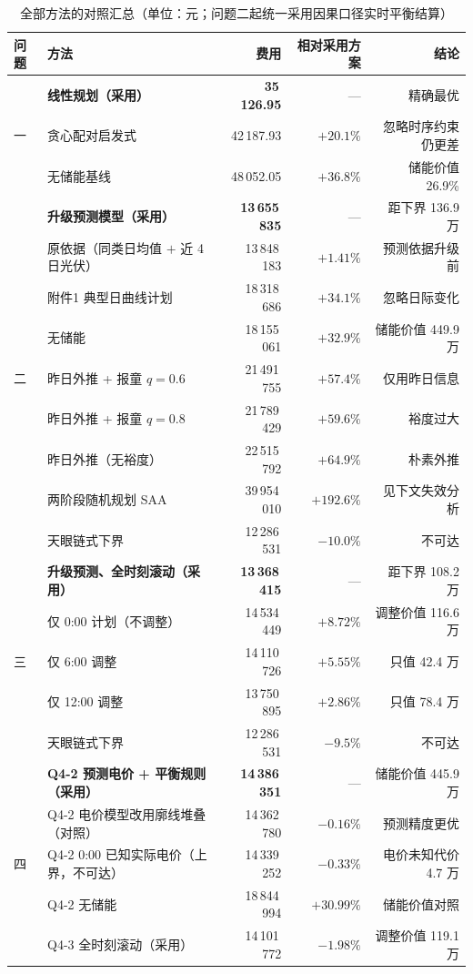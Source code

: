\documentclass[12pt,a4paper,fontset=fandol]{ctexart}
\begin{document}
\begin{table}[htbp]
\centering
\caption{全部方法的对照汇总（单位\nobreak：元\nobreak；问题二起统一采用因果口径实时平衡结算\nobreak）}
\label{tab:allcmp}
\begin{tabularx}{\textwidth}{@{}p{1.5cm}Xrrr@{}}
\toprule
问题 & 方法 & 费用 & 相对采用方案 & 结论 \\
\midrule
\multirow{3}{*}{一}
& \textbf{线性规划（采用\nobreak）} & \textbf{35\,126.95} & --- & 精确最优 \\
& 贪心配对启发式 & 42\,187.93 & $+20.1\text{\%}$ & 忽略时序约束仍更差 \\
& 无储能基线 & 48\,052.05 & $+36.8\text{\%}$ & 储能价值 26.9\% \\
\midrule
\multirow{9}{*}{二}
& \textbf{升级预测模型（采用\nobreak）} & \textbf{13\,655\,835} & --- & 距下界 136.9 万 \\
& 原依据（同类日均值 $+$ 近 4 日光伏\nobreak） & 13\,848\,183 & $+1.41\text{\%}$ & 预测依据升级前 \\
& 附件1 典型日曲线计划 & 18\,318\,686 & $+34.1\text{\%}$ & 忽略日际变化 \\
& 无储能 & 18\,155\,061 & $+32.9\text{\%}$ & 储能价值 449.9 万 \\
& 昨日外推 + 报童 $q=0.6$ & 21\,491\,755 & $+57.4\text{\%}$ & 仅用昨日信息 \\
& 昨日外推 + 报童 $q=0.8$ & 21\,789\,429 & $+59.6\text{\%}$ & 裕度过大 \\
& 昨日外推（无裕度\nobreak） & 22\,515\,792 & $+64.9\text{\%}$ & 朴素外推 \\
& 两阶段随机规划 SAA & 39\,954\,010 & $+192.6\text{\%}$ & 见下文失效分析 \\
& 天眼链式下界 & 12\,286\,531 & $-10.0\text{\%}$ & 不可达 \\
\midrule
\multirow{5}{*}{三}
& \textbf{升级预测\nobreak、全时刻滚动（采用\nobreak）} & \textbf{13\,368\,415} & --- & 距下界 108.2 万 \\
& 仅 0:00 计划（不调整\nobreak） & 14\,534\,449 & $+8.72\text{\%}$ & 调整价值 116.6 万 \\
& 仅 6:00 调整 & 14\,110\,726 & $+5.55\text{\%}$ & 只值 42.4 万 \\
& 仅 12:00 调整 & 13\,750\,895 & $+2.86\text{\%}$ & 只值 78.4 万 \\
& 天眼链式下界 & 12\,286\,531 & $-9.5\text{\%}$ & 不可达 \\
\midrule
\multirow{5}{*}{四}
& \textbf{Q4-2 预测电价 + 平衡规则（采用\nobreak）} & \textbf{14\,386\,351} & --- & 储能价值 445.9 万 \\
& Q4-2 电价模型改用廓线堆叠（对照\nobreak） & 14\,362\,780 & $-0.16\text{\%}$ & 预测精度更优 \\
& Q4-2 0:00 已知实际电价（上界\nobreak，不可达\nobreak） & 14\,339\,252 & $-0.33\text{\%}$ & 电价未知代价 4.7 万 \\
& Q4-2 无储能 & 18\,844\,994 & $+30.99\text{\%}$ & 储能价值对照 \\
& Q4-3 全时刻滚动（采用\nobreak） & 14\,101\,772 & $-1.98\text{\%}$ & 调整价值 119.1 万 \\
\bottomrule
\end{tabularx}
\end{table}
\end{document}
